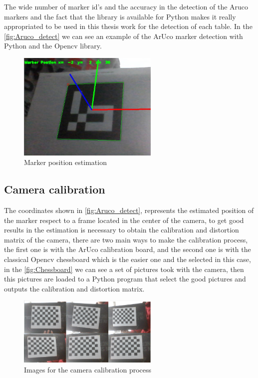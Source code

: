 The wide number of marker id's and the accuracy in the detection of the Aruco markers and the fact that the library is available for Python makes it really appropriated to be used in this thesis work for the detection of each table. In the \autoref{fig:Aruco_detect}  we can see an example of the ArUco marker detection with Python and the Opencv library.

\begin{figure}[H]
    \centering
 	\includegraphics[trim=0 0 0 0,clip,width=0.6\textwidth]{Figs/Aruco.JPG}
    \caption{Marker position estimation}
    \label{fig:Aruco_detect}
\end{figure}

\subsection{Camera calibration}

The coordinates shown in \autoref{fig:Aruco_detect}, represents the estimated position of the marker respect to a frame located in the center of the camera, to get good results in the estimation is necessary to obtain the calibration and distortion matrix of the camera, there are two main ways to make the calibration process, the first one is with the ArUco calibration board, and the second one is with the classical Opencv chessboard which is the easier one and the selected in this case, in the \autoref{fig:Chessboard} we can see a set of pictures took with the camera, then this pictures are loaded to a Python program that select the good pictures and outputs the calibration and distortion matrix.

\begin{figure}[h!]
    \centering
 	\includegraphics[trim=0 0 0 0,clip,width=0.6\textwidth]{Figs/Calib.png}
    \caption{Images for the camera calibration process}
    \label{fig:Chessboard}
\end{figure}



